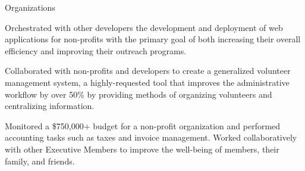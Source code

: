 \documentclass{resume} %
\begin{document}
\begin{workSection}{Organizations}
    \customItem[
        title=Bits of Good,
        keyHighlight=Developer,
        duration=January 2023 - Present,
        location=Atlanta{,} GA
    ]
     \begin{bullets}
       \item Orchestrated with other developers the development and deployment of web applications for non-profits with the primary goal of both increasing their overall efficiency and improving their outreach programs.
       \item Collaborated with non-profits and developers to create a generalized volunteer management system, a highly-requested tool that improves the administrative workflow by over 50\% by providing methods of organizing volunteers and centralizing information.

     \end{bullets}
    \customItem[
        title=Delta Chi Fraternity,
        keyHighlight=Treasurer{,} Technology Chair,
        duration=August 2021 - Present,
        location=Atlanta{,} GA
    ]
    \begin{bullets}
        \item Monitored a \$750,000+ budget for a non-profit organization and performed accounting tasks such as taxes and invoice management. Worked collaboratively with other Executive Members to improve the well-being of members, their family, and friends.
    \end{bullets}
     
     
\end{workSection}
\end{document}

